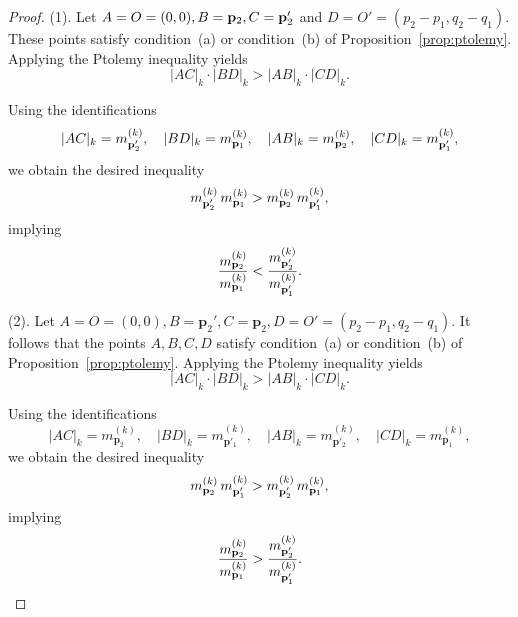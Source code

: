 \documentclass[10pt,a4paper]{amsart}
\begin{document}
\begin{proof}
(1). Let $A=O=(0,0), B={\bf p}_2, C={\bf p}'_2$ and $D=O'=(p_2-p_1,q_2-q_1)$. These points satisfy condition~(a) or condition~(b) of Proposition~\ref{prop:ptolemy}.  
Applying the Ptolemy inequality yields
\[
    |AC|_k \cdot |BD|_k > |AB|_k \cdot |CD|_k.
\]

Using the identifications
\[
    |AC|_k = m^{(k)}_{{\bf p}'_2}, \quad 
    |BD|_k = m^{(k)}_{{\bf p}_1}, \quad 
    |AB|_k = m^{(k)}_{{\bf p}_2}, \quad 
    |CD|_k = m^{(k)}_{{\bf p}'_1},
\]
we obtain the desired inequality
\[
    m^{(k)}_{{\bf p}'_2} \, m^{(k)}_{{\bf p}_1} 
    > 
   m^{(k)}_{{\bf p}_2} \, m^{(k)}_{{\bf p}'_1},
\]
implying 
\[
    \frac{m^{(k)}_{{\bf p}_2}}{m^{(k)}_{{\bf p}_1}} 
    < 
    \frac{m^{(k)}_{{\bf p}'_2}}{m^{(k)}_{{\bf p}'_1}}.
    \]

(2). Let $A=O=(0,0), B=\mathbf{p}_2', C=\mathbf{p}_2, D=O'=(p_2-p_1,q_2-q_1)$. It follows that the points $A,B,C,D$ satisfy condition~(a) or condition~(b) of Proposition~\ref{prop:ptolemy}.  
Applying the Ptolemy inequality yields
\[
    |AC|_k \cdot |BD|_k > |AB|_k \cdot |CD|_k.
\]

Using the identifications
\[
    |AC|_k = m^{(k)}_{\mathbf{p}_2}, \quad 
    |BD|_k = m^{(k)}_{\mathbf{p}'_1}, \quad 
    |AB|_k = m^{(k)}_{\mathbf{p}'_2}, \quad 
    |CD|_k = m^{(k)}_{\mathbf{p}_1},
\]
we obtain the desired inequality
\[
    m^{(k)}_{{\bf p}_2} \, m^{(k)}_{{\bf p}'_1} 
    > 
   m^{(k)}_{{\bf p}'_2} \, m^{(k)}_{{\bf p}_1},
\]
implying
\[
    \frac{m^{(k)}_{{\bf p}_2}}{m^{(k)}_{{\bf p}_1}} 
    >
    \frac{m^{(k)}_{{\bf p}'_2}}{m^{(k)}_{{\bf p}'_1}}.
    \]
\end{proof}
\end{document}

